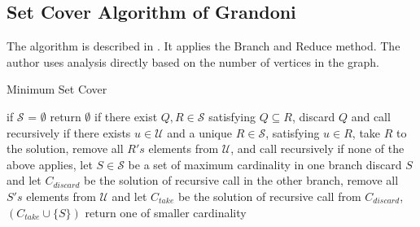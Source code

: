 \subsection{Set Cover Algorithm of Grandoni}
The algorithm is described in \cite{GRANDONI2006209}. It applies the Branch and Reduce method. The author uses analysis directly based on the number of vertices in the graph.

\begin{algorithm}[H]
\caption{Minimum Set Cover}
\label{alg:grandoni}
\begin{algorithmic}[1]
\State if $\mathcal{S}$ = $\emptyset$ return $\emptyset$ 
\State if there exist  $Q, R \in \mathcal{S}$ satisfying $Q \subseteq R$, discard $Q$ and call recursively
\State if there exists $u\in \mathcal{U}$ and a unique $R\in\mathcal{S}$, satisfying $u \in R$, take $R$ to the solution, remove all $R's$ elements from $\mathcal{U}$, and call recursively
\State if none of the above applies, let $S \in \mathcal{S}$ be a set of maximum cardinality
\State in one branch discard $S$ and let $C_{discard}$ be the solution of recursive call
\State in the other branch, remove all $S's$ elements from $\mathcal{U}$ and let $C_{take}$ be the solution of recursive call
\State from $C_{discard}$, $(C_{take} \cup \{S\})$ return one of smaller cardinality
\EndProcedure
\end{algorithmic}
\end{algorithm}

